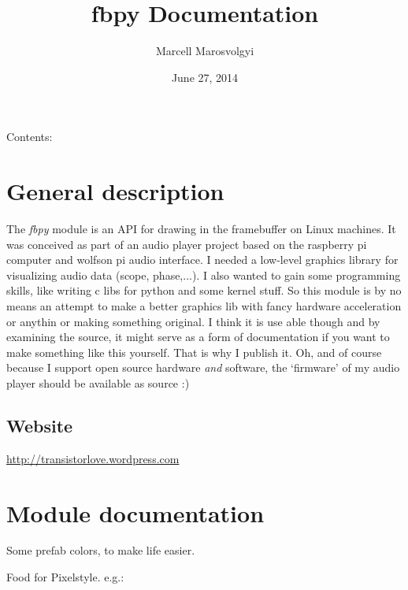 \documentclass[letterpaper,10pt,english]{sphinxmanual}
\title{fbpy Documentation}
\date{June 27, 2014}
\author{Marcell Marosvolgyi}
\begin{document}
\maketitle
\tableofcontents
{}\label{index::doc}


Contents:


\chapter{General description}
\label{index:general-description}\label{index:welcome-to-fbpy-s-documentation}
The \emph{fbpy} module is an API for drawing in the framebuffer on Linux machines.
It was conceived as part of an audio player project based on the
raspberry pi computer and wolfson pi audio interface. I needed a low-level
graphics library for visualizing audio data (scope, phase,...). I also
wanted to gain some programming skills, like writing c libs for python and
some kernel stuff. So this module is by no means an attempt to make a
better graphics lib with fancy hardware acceleration or anythin or
making something original. I think it is use able though and by examining
the source, it might serve as a form of documentation if you want to
make something like this yourself. That is why I publish it. Oh, and of course
because I support open source hardware \emph{and} software, the `firmware' of
my audio player should be available as source :)


\section{Website}
\label{index:website}
\href{http://transistorlove.wordpress.com}{http://transistorlove.wordpress.com}


\chapter{Module documentation}
\label{index:module-fb}\label{index:module-documentation}

\begin{fulllineitems}
\label{index:fb.Colors}
Some prefab colors, to make life easier.

Food for Pixelstyle. e.g.:

\end{fulllineitems}

\end{document}
